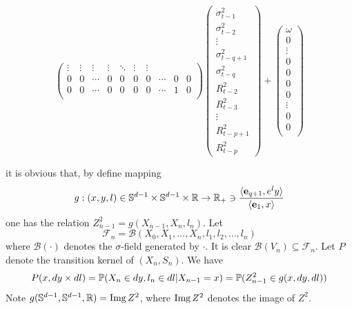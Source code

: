 \documentclass[aoas,preprint]{imsart}
\numberwithin{equation}{section}
\theoremstyle{plain}
\begin{document}
\begin{tiny}
\begin{equation*}
\begin{pmatrix}
        \vdots & \vdots & \vdots & \vdots &
        \ddots & \vdots & \vdots \\
        0 & 0 & \cdots &
        0 & 0 & 0 & 0 & \cdots & 0 & 0 \\    
        0 & 0 & \cdots &
        0 & 0 & 0 & 0 & \cdots & 1 & 0 \\    
      \end{pmatrix}
      \begin{pmatrix}
        \sigma_{t-1}^2 \\
        \sigma_{t-2}^2 \\
        \vdots \\
        \sigma_{t-q+1}^2 \\
        \sigma_{t-q}^2 \\
        R_{t-2}^2 \\
        R_{t-3}^2 \\
        \vdots \\
        R_{t-p+1}^2 \\
        R_{t-p}^2
      \end{pmatrix}
      +
      \begin{pmatrix}
        \omega \\
        0 \\
        \vdots \\
        0 \\
        0 \\
        0 \\
        0 \\
        \vdots \\
        0 \\
        0 \\
      \end{pmatrix}
  \end{equation*}
\end{tiny}
it is obvious that, by define mapping
\[
g: (x, y, l) \in \sphere^{d-1} \times \sphere^{d-1} \times \reals
\to
\reals_+ \ni {
  \inn{\vec e_{q+1}, e^l y}
  \over
  \inn{\vec e_{1}, x}
}
\]
one has the relation $Z_{n-1}^2 = g(X_{n-1}, X_n, l_n)$. Let
\[
\mathscr F_n = \mathcal B(X_0, X_1, \dots, X_n, l_1, l_2, \dots, l_n)
\]
where $\mathcal B(\cdot)$ denotes the $\sigma$-field generated by
$\cdot$. It is clear $\mathcal B(V_n) \subseteq \mathscr F_n$.
Let $P$ denote the transition kernel of $(X_n, S_n)$. We have
\[
  P(x, dy \times dl) = \P(X_n \in dy, l_n \in dl | X_{n-1} = x)
  = \P(Z_{n-1}^2 \in g(x, dy, dl))
  \]
Note $g(\sphere^{d-1}, \sphere^{d-1}, \reals) = \img Z^2$,
where $\img Z^2$ denotes the image of $Z^2$.
\end{document}
